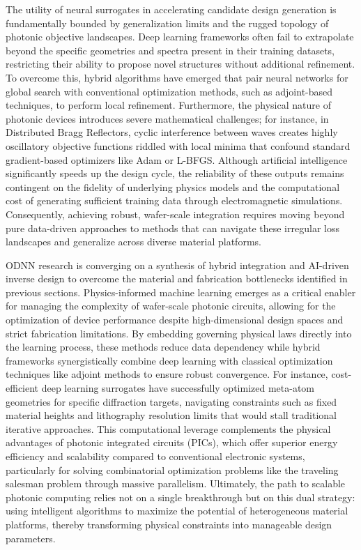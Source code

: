 \documentclass[11pt]{article}
\begin{document}
The utility of neural surrogates in accelerating candidate design generation is fundamentally bounded by generalization limits and the rugged topology of photonic objective landscapes. Deep learning frameworks often fail to extrapolate beyond the specific geometries and spectra present in their training datasets, restricting their ability to propose novel structures without additional refinement. To overcome this, hybrid algorithms have emerged that pair neural networks for global search with conventional optimization methods, such as adjoint-based techniques, to perform local refinement. Furthermore, the physical nature of photonic devices introduces severe mathematical challenges; for instance, in Distributed Bragg Reflectors, cyclic interference between waves creates highly oscillatory objective functions riddled with local minima that confound standard gradient-based optimizers like Adam or L-BFGS. Although artificial intelligence significantly speeds up the design cycle, the reliability of these outputs remains contingent on the fidelity of underlying physics models and the computational cost of generating sufficient training data through electromagnetic simulations. Consequently, achieving robust, wafer-scale integration requires moving beyond pure data-driven approaches to methods that can navigate these irregular loss landscapes and generalize across diverse material platforms. \citep{doi_10_1021_acsphotonics_2c00968_06a2e96b} \citep{doi_10_48550_arxiv_2602_18148_e9c0a72b} \citep{doi_10_1515_nanoph_2024_0536_4b6631ba}

ODNN research is converging on a synthesis of hybrid integration and AI-driven inverse design to overcome the material and fabrication bottlenecks identified in previous sections. Physics-informed machine learning emerges as a critical enabler for managing the complexity of wafer-scale photonic circuits, allowing for the optimization of device performance despite high-dimensional design spaces and strict fabrication limitations. By embedding governing physical laws directly into the learning process, these methods reduce data dependency while hybrid frameworks synergistically combine deep learning with classical optimization techniques like adjoint methods to ensure robust convergence. For instance, cost-efficient deep learning surrogates have successfully optimized meta-atom geometries for specific diffraction targets, navigating constraints such as fixed material heights and lithography resolution limits that would stall traditional iterative approaches. This computational leverage complements the physical advantages of photonic integrated circuits (PICs), which offer superior energy efficiency and scalability compared to conventional electronic systems, particularly for solving combinatorial optimization problems like the traveling salesman problem through massive parallelism. Ultimately, the path to scalable photonic computing relies not on a single breakthrough but on this dual strategy: using intelligent algorithms to maximize the potential of heterogeneous material platforms, thereby transforming physical constraints into manageable design parameters. \citep{doi_10_1109_sbfotoniopc62248_2024_10813471_692f0088} \citep{doi_10_1021_acsami_5c03196_32a62b73} \citep{doi_10_3390_nano14080697_c372a140}
\end{document}

